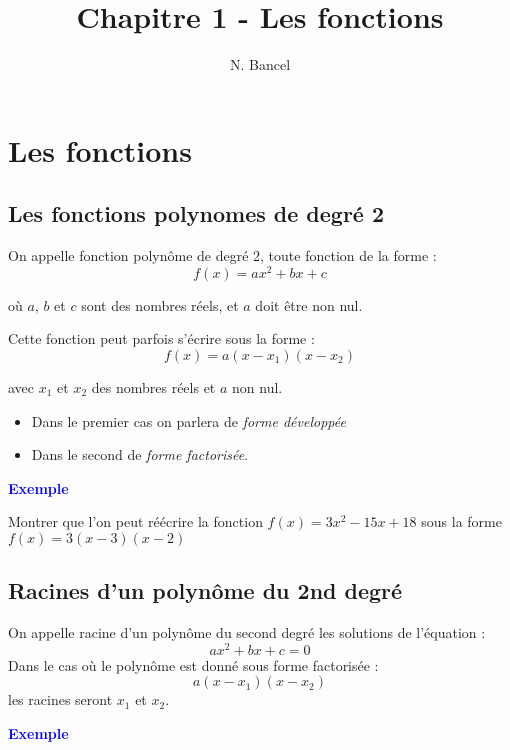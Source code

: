 \documentclass[a4paper,12pt]{article}
\begin{document}
\title{Chapitre 1 - Les fonctions}
\author{N. Bancel}

\maketitle

\section*{Les fonctions}



\subsection*{Les fonctions polynomes de degré 2}

On appelle fonction polynôme de degré 2, toute fonction de la forme :
\[
    f(x) = ax^2 + bx + c
\]


où $a$, $b$ et $c$ sont des nombres réels, et $a$ doit être non nul.

Cette fonction peut parfois s'écrire sous la forme : 
\[
    f(x) = a(x - x_1)(x - x_2)
\]

avec $x_1$ et $x_2$ des nombres réels et $a$ non nul.

\begin{itemize}[noitemsep]
  \item Dans le premier cas on parlera de \textit{forme développée}
  \item Dans le second de \textit{forme factorisée}.
\end{itemize}


\textbf{\textcolor{blue}{Exemple}} \par 

Montrer que l'on peut réécrire la fonction $f(x) = 3x^2 - 15x + 18$ sous la forme $f(x) = 3(x - 3)(x - 2)$

\subsection*{Racines d'un polynôme du 2nd degré}

On appelle racine d'un polynôme du second degré les solutions de l'équation :
\[
    ax^2 + bx + c = 0
\]
Dans le cas où le polynôme est donné sous forme factorisée :
\[
    a(x - x_1)(x - x_2)
\]
les racines seront $x_1$ et $x_2$.


\textbf{\textcolor{blue}{Exemple}} \par
\end{document}
